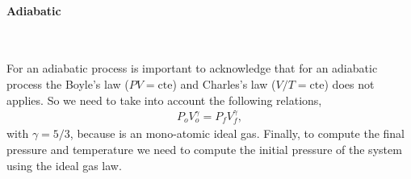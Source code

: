 \documentclass[main.tex]{subfiles}
\begin{document}

\paragraph{Adiabatic}~\label{par:adiabaticWork}

For an adiabatic process is important to acknowledge that for an adiabatic process the Boyle's law ($PV=\mathrm{cte}$) and Charles's law ($V/T=\mathrm{cte}$) does not applies.
So we need to take into account the following relations,
\begin{gather*}
    P_oV_o^\gamma = P_fV_f^\gamma, %
\end{gather*}
with $\gamma = 5/3$, because is an mono-atomic ideal gas.
Finally, to compute the final pressure and temperature we need to compute the initial pressure of the system using the ideal gas law.
\end{document}
